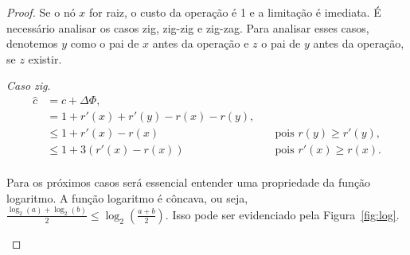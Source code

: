 \begin{proof}
    Se o nó $x$ for raiz, o custo da operação é 1 e a limitação é imediata. É necessário analisar os casos zig, zig-zig e zig-zag. Para analisar esses casos, denotemos $y$ como o pai de $x$ antes da operação e $z$ o pai de $y$ antes da operação, se $z$ existir.

    \textit{Caso zig}.   
    \begin{align*}
        \hat{c} &= c + \Delta \Phi,\\
        &= 1 + r'(x) + r'(y) - r(x) - r(y), \quad & \text{}\\
        &\leq 1 + r'(x) - r(x) \quad & \text{pois $r(y) \geq r'(y)$},\\
        &\leq 1 + 3(r'(x) - r(x)) \quad & \text{pois $r'(x) \geq r(x)$}.\\
    \end{align*}

    Para os próximos casos será essencial entender uma propriedade da função logaritmo. A função logaritmo é côncava, ou seja, $\frac{\log_2(a) + \log_2(b)}{2} \leq \log_2(\frac{a+b}{2})$. Isso pode ser evidenciado pela Figura~\ref{fig:log}.

    \begin{figure}
\end{figure}
\end{proof}

